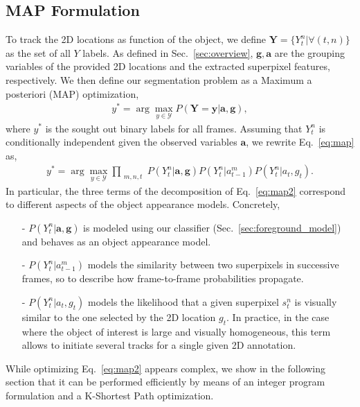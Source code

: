\subsection{MAP Formulation}\label{sec:MAP}
To track the 2D locations as function of the object, we define $\bm{Y} = \{Y_t^n|\forall(t,n)\}$ as the set of all $Y$ labels.
As defined in Sec.~\ref{sec:overview}, $\bm{g}, \bm{a}$ are the grouping variables of the provided 2D locations and the extracted superpixel features, respectively.
We then define our segmentation problem as a Maximum a posteriori (MAP) optimization,
    \begin{equation}
    \begin{split}
    y^* = \arg \max_{y \in \mathcal{Y}} P(\bm{Y}=\bm{y}|\bm{a}, \bm{g}),
    \end{split}
    \label{eq:map}
    \end{equation}
\noindent
where $y^*$ is the sought out binary labels for all frames. Assuming that $Y_t^n$ is conditionally independent given the observed variables $\bm{a}$, we rewrite Eq.~\eqref{eq:map} as,
    \begin{equation}
    \begin{split}
    y^* = \arg \max_{y \in \mathcal{Y}} \prod_{\substack{m,n,t}} P(Y_t^{n}|\bm{a},\bm{g}) P(Y_t^{n}|a_{t-1}^{m})P(Y_t^{n}|a_t,g_t).
    \end{split}
    \label{eq:map2}
    \end{equation}
\noindent
In particular, the three terms of the decomposition of Eq.~\eqref{eq:map2} correspond to different aspects of the object appearance models. Concretely,
\begin{itemize}
\item[-]  {$P(Y_t^{n}|\bm{a},\bm{g})$} is modeled using our classifier (Sec.~\ref{sec:foreground_model}) and behaves as an object appearance model. 
\item[-] {$P(Y_t^{n}|a_{t-1}^{m})$} models the similarity between two superpixels in successive frames, so to describe how frame-to-frame probabilities propagate. 
\item[-] {$P(Y_t^{n}|a_t,g_t)$} models the likelihood that a given superpixel $s_t^n$ is visually similar to the one selected by the 2D location $g_t$. In practice, in the case where the object of interest is large and visually homogeneous, this term allows to initiate several tracks for a single given 2D annotation.
\end{itemize}

While optimizing Eq.~\eqref{eq:map2} appears complex, we show in the following section that it can be performed efficiently by means of an integer program formulation and a K-Shortest Path optimization. %

